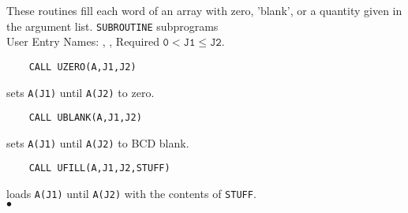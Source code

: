                      
                     
              
      
These routines fill each word of an array with zero, 'blank',
or a quantity given in the argument list.
\Structure
{\tt SUBROUTINE} subprograms \\
User Entry Names: , , 
\Usage
Required $\mathtt{ 0 < J1 \leq J2}$.
\begin{verbatim}
    CALL UZERO(A,J1,J2)
\end{verbatim}
sets {\tt A(J1)} until {\tt A(J2)} to zero.
\begin{verbatim}
    CALL UBLANK(A,J1,J2)
\end{verbatim}
sets {\tt A(J1)} until {\tt A(J2)} to BCD blank.
\begin{verbatim}
    CALL UFILL(A,J1,J2,STUFF)
\end{verbatim}
loads {\tt A(J1)} until {\tt A(J2)} with the contents of {\tt STUFF}.
\\ $\bullet$
